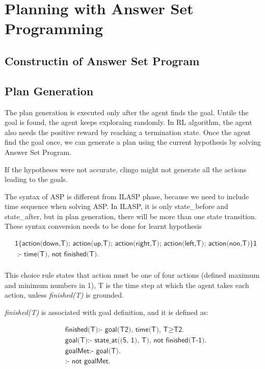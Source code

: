 \section{Planning with Answer Set Programming}
\label{sec:planning}

\subsection{Constructin of Answer Set Program}
\label{subsec:construction_asp}

\subsection{Plan Generation}
\label{Plan_generation}

The plan generation is executed only after the agent finds the goal. Untile the goal is found, the agent keeps exploraing randomly.
In RL algorithm, the agent also needs the positive reward by reaching a termination state. 
Once the agent find the goal once, we can generate a plan using the current hypothesis by solving Answer Set Program.

If the hypotheses were not accurate, clingo might not generate all the actions leading to the goals.

The syntax of ASP is different from ILASP phase, because we need to include time sequence when solving ASP.
In ILASP, it is only state\_before and state\_after, but in plan generation, there will be more than one state transition.
These syntax conversion needs to be done for learnt hypothesis

\begin{equation}
\begin{split}
&\textsf{1\{action(down,T); action(up,T); action(right,T); action(left,T); action(non,T)\}1} \\
&\textsf{ :- time(T), not finished(T).}\\
\end{split}
\end{equation}

This choice rule states that action must be one of four actions (defined maximum and minimum numbers in 1),
T is the time step at which the agent takes each action, unless \textit{finished(T)} is grounded.

\textit{finished(T)} is associated with goal definition, and it is defined as:

\begin{equation}
\begin{split}
&\textsf{finished(T):- goal(T2), time(T), T} \geq \textsf{T2.}\\
&\textsf{goal(T):- state\_at((5, 1), T), not finished(T-1).}\\
&\textsf{goalMet:- goal(T).}\\
&\textsf{:- not goalMet.}
\end{split}
\end{equation}

